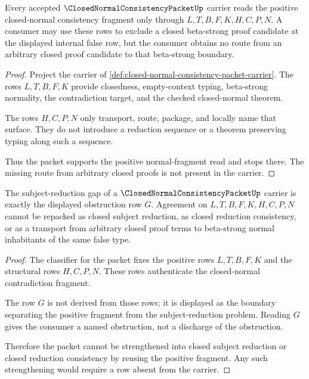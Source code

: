 \begin{theorem}
\label{thm:closed-normal-consistency-boundary-normal-fragment}
Every accepted $\ClosedNormalConsistencyPacketUp$ carrier reads the positive closed-normal consistency fragment only through $L,T,B,F,K,H,C,P,N$. A consumer may use these rows to exclude a closed beta-strong proof candidate at the displayed internal false row, but the consumer obtains no route from an arbitrary closed proof candidate to that beta-strong boundary.
\end{theorem}
\begin{proof}
Project the carrier of \autoref{def:closed-normal-consistency-packet-carrier}. The rows $L,T,B,F,K$ provide closedness, empty-context typing, beta-strong normality, the contradiction target, and the checked closed-normal theorem.

The rows $H,C,P,N$ only transport, route, package, and locally name that surface. They do not introduce a reduction sequence or a theorem preserving typing along such a sequence.

Thus the packet supports the positive normal-fragment read and stops there. The missing route from arbitrary closed proofs is not present in the carrier.
\end{proof}

\begin{theorem}
\label{thm:closed-normal-consistency-boundary-subject-reduction-gap}
The subject-reduction gap of a $\ClosedNormalConsistencyPacketUp$ carrier is exactly the displayed obstruction row $G$. Agreement on $L,T,B,F,K,H,C,P,N$ cannot be repacked as closed subject reduction, as closed reduction consistency, or as a transport from arbitrary closed proof terms to beta-strong normal inhabitants of the same false type.
\end{theorem}
\begin{proof}
The classifier for the packet fixes the positive rows $L,T,B,F,K$ and the structural rows $H,C,P,N$. These rows authenticate the closed-normal contradiction fragment.

The row $G$ is not derived from those rows; it is displayed as the boundary separating the positive fragment from the subject-reduction problem. Reading $G$ gives the consumer a named obstruction, not a discharge of the obstruction.

Therefore the packet cannot be strengthened into closed subject reduction or closed reduction consistency by reusing the positive fragment. Any such strengthening would require a row absent from the carrier.
\end{proof}

